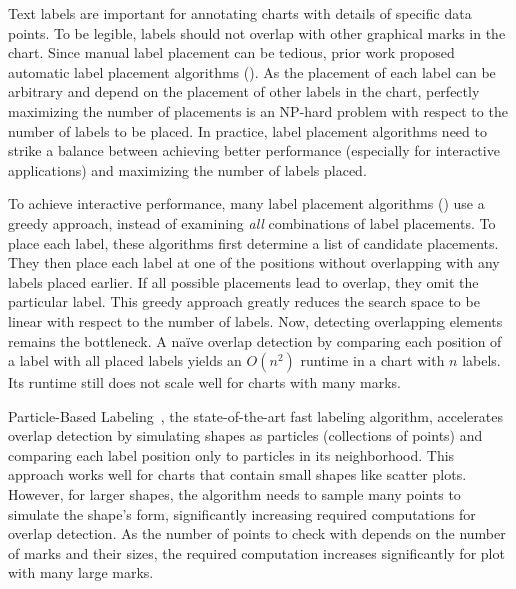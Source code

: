 \maketitle

Text labels are important for annotating charts with details of specific data points.
To be legible, labels should not overlap with other graphical marks in the chart.
Since manual label placement can be tedious, prior work proposed automatic label placement algorithms (\eg \cite{luboschik:particle,mote:informed-greedy,zoraster:int-program,zoraster:annealing}).
As the placement of each label can be arbitrary and depend on the placement of other labels in the chart,
perfectly maximizing the number of placements is an NP-hard problem with respect to the number of labels to be placed.
In practice, label placement algorithms need to strike a balance between achieving better performance
(especially for interactive applications) and maximizing the number of labels placed.

To achieve interactive performance, many label placement algorithms (\eg \cite{luboschik:particle,mote:informed-greedy}) use a greedy approach, instead of examining \emph{all} combinations of label placements.
To place each label, these algorithms first determine a list of candidate placements.
They then place each label at one of the positions without overlapping with any labels placed earlier.
If all possible placements lead to overlap, they omit the particular label.
This greedy approach greatly reduces the search space to be linear with respect to the number of labels.
Now, detecting overlapping elements remains the bottleneck.
A naïve overlap detection by comparing each position of a label with all placed labels yields an $O(n^2)$ runtime in a chart with $n$ labels.
Its runtime still does not scale well for charts with many marks.

Particle-Based Labeling~\cite{luboschik:particle}, the state-of-the-art fast labeling algorithm,
accelerates overlap detection by simulating shapes as particles (collections of points) and
comparing each label position only to particles in its neighborhood.
This approach works well for charts that contain small shapes like scatter plots.
However, for larger shapes, the algorithm needs to sample many points to simulate the shape's form,
significantly increasing required computations for overlap detection.
As the number of points to check with depends on the number of marks and their sizes, the required computation increases significantly for plot with many large marks.

